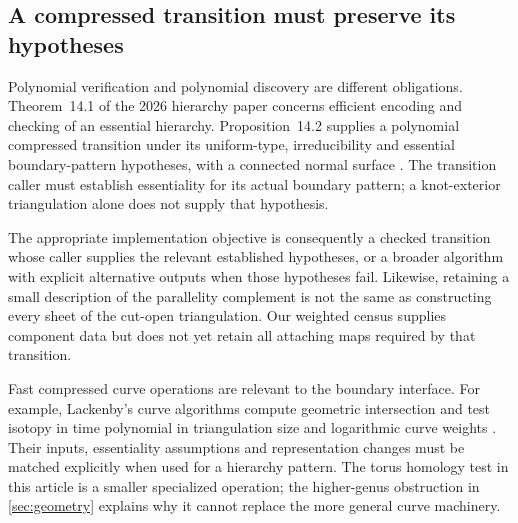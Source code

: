 \subsection{A compressed transition must preserve its hypotheses}

Polynomial verification and polynomial discovery are different obligations.
Theorem~14.1 of the 2026 hierarchy paper concerns efficient encoding and
checking of an essential hierarchy. Proposition~14.2 supplies a polynomial
compressed transition under its uniform-type, irreducibility and essential
boundary-pattern hypotheses, with a connected normal surface
\cite{Lackenby2026}. The transition caller must establish essentiality for its actual boundary
pattern; a knot-exterior triangulation alone does not supply that hypothesis.

The appropriate implementation objective is consequently a checked transition
whose caller supplies the relevant established hypotheses, or a broader
algorithm with explicit alternative outputs when those hypotheses fail.
Likewise, retaining a small description of the parallelity complement is not
the same as constructing every sheet of the cut-open triangulation. Our
weighted census supplies component data but does not yet retain all attaching
maps required by that transition.

Fast compressed curve operations are relevant to the boundary interface.
For example, Lackenby's curve algorithms compute geometric intersection and
test isotopy in time polynomial in triangulation size and logarithmic curve
weights \cite{LackenbyCurves2026}. Their inputs, essentiality assumptions and
representation changes must be matched explicitly when used for a hierarchy
pattern. The torus homology test in this article is a smaller specialized
operation; the higher-genus obstruction in \cref{sec:geometry} explains why
it cannot replace the more general curve machinery.


